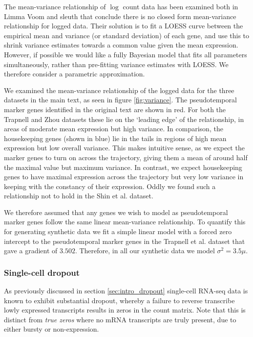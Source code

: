  The mean-variance relationship of $\log$ count data has been examined both in Limma Voom \cite{Law2014-tu}
 and sleuth \cite{Pimentel2016-xz} that conclude there is no closed form mean-variance relationship for logged data. Their solution is to fit a LOESS curve between the empirical mean and variance (or standard deviation) of each gene, and use this to shrink variance estimates towards a common value given the mean expression. However, if possible we would like a fully Bayesian model that fits all parameters simultaneously, rather than pre-fitting variance estimates with LOESS. We therefore consider a parametric approximation.

We examined the mean-variance relationship of the logged data for the three datasets in the main text, as seen in figure \ref{fig:variance}. The pseudotemporal marker genes identified in the original text are shown in red. For both the Trapnell and Zhou datasets these lie on the `leading edge' of the relationship, in areas of moderate mean expression but high variance. In comparison, the housekeeping genes (shown in blue) lie in the tails in regions of high mean expression but low overall variance. This makes intuitive sense, as we expect the marker genes to turn on across the trajectory, giving them a mean of around half the maximal value but maximum variance. In contrast, we expect housekeeping genes to have maximal expression across the trajectory but very low variance in keeping with the constancy of their expression. Oddly we found such a relationship not to hold in the Shin et al. dataset.


We therefore assumed that any genes we wish to model as pseudotemporal marker genes follow the same linear mean-variance relationship. To quantify this for generating synthetic data we fit a simple linear model with a forced zero intercept to the pseudotemporal marker genes in the Trapnell et al. dataset that gave a gradient of $3.502$. Therefore, in all our synthetic data we model $\sigma^2 = 3.5 \mu$.


\subsubsection{Single-cell dropout}



As previously discussed in section \ref{sec:intro_dropout} single-cell RNA-seq data is known to exhibit substantial dropout, whereby a failure to reverse transcribe lowly expressed transcripts results in zeros in the count matrix. Note that this is distinct from \emph{true zeros} where no mRNA transcripts are truly present, due to either bursty or non-expression.

